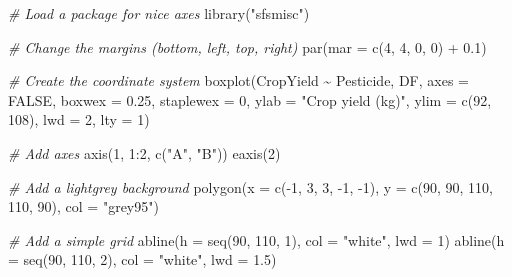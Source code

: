 \documentclass[
]{book}
\newenvironment{Shaded}{\begin{snugshade}}{\end{snugshade}}
\newcommand{\AttributeTok}[1]{\textcolor[rgb]{0.77,0.63,0.00}{#1}}
\newcommand{\CommentTok}[1]{\textcolor[rgb]{0.56,0.35,0.01}{\textit{#1}}}
\newcommand{\ConstantTok}[1]{\textcolor[rgb]{0.00,0.00,0.00}{#1}}
\newcommand{\DecValTok}[1]{\textcolor[rgb]{0.00,0.00,0.81}{#1}}
\newcommand{\FloatTok}[1]{\textcolor[rgb]{0.00,0.00,0.81}{#1}}
\newcommand{\FunctionTok}[1]{\textcolor[rgb]{0.00,0.00,0.00}{#1}}
\newcommand{\NormalTok}[1]{#1}
\newcommand{\SpecialCharTok}[1]{\textcolor[rgb]{0.00,0.00,0.00}{#1}}
\newcommand{\StringTok}[1]{\textcolor[rgb]{0.31,0.60,0.02}{#1}}
\begin{document}
\begin{Shaded}
\begin{Highlighting}[]
\CommentTok{\# Load a package for nice axes}
\FunctionTok{library}\NormalTok{(}\StringTok{"sfsmisc"}\NormalTok{)}

\CommentTok{\# Change the margins (bottom, left, top, right)}
\FunctionTok{par}\NormalTok{(}\AttributeTok{mar =} \FunctionTok{c}\NormalTok{(}\DecValTok{4}\NormalTok{, }\DecValTok{4}\NormalTok{, }\DecValTok{0}\NormalTok{, }\DecValTok{0}\NormalTok{) }\SpecialCharTok{+} \FloatTok{0.1}\NormalTok{)}

\CommentTok{\# Create the coordinate system}
\FunctionTok{boxplot}\NormalTok{(CropYield }\SpecialCharTok{\textasciitilde{}}\NormalTok{ Pesticide, DF, }\AttributeTok{axes =} \ConstantTok{FALSE}\NormalTok{, }\AttributeTok{boxwex =} \FloatTok{0.25}\NormalTok{, }\AttributeTok{staplewex =} \DecValTok{0}\NormalTok{,}
        \AttributeTok{ylab =} \StringTok{"Crop yield (kg)"}\NormalTok{, }\AttributeTok{ylim =} \FunctionTok{c}\NormalTok{(}\DecValTok{92}\NormalTok{, }\DecValTok{108}\NormalTok{), }\AttributeTok{lwd =} \DecValTok{2}\NormalTok{, }\AttributeTok{lty =} \DecValTok{1}\NormalTok{)}

\CommentTok{\# Add axes}
\FunctionTok{axis}\NormalTok{(}\DecValTok{1}\NormalTok{, }\DecValTok{1}\SpecialCharTok{:}\DecValTok{2}\NormalTok{, }\FunctionTok{c}\NormalTok{(}\StringTok{"A"}\NormalTok{, }\StringTok{"B"}\NormalTok{))}
\FunctionTok{eaxis}\NormalTok{(}\DecValTok{2}\NormalTok{)}

\CommentTok{\# Add a lightgrey background}
\FunctionTok{polygon}\NormalTok{(}\AttributeTok{x =} \FunctionTok{c}\NormalTok{(}\SpecialCharTok{{-}}\DecValTok{1}\NormalTok{, }\DecValTok{3}\NormalTok{, }\DecValTok{3}\NormalTok{, }\SpecialCharTok{{-}}\DecValTok{1}\NormalTok{, }\SpecialCharTok{{-}}\DecValTok{1}\NormalTok{), }\AttributeTok{y =} \FunctionTok{c}\NormalTok{(}\DecValTok{90}\NormalTok{, }\DecValTok{90}\NormalTok{, }\DecValTok{110}\NormalTok{, }\DecValTok{110}\NormalTok{, }\DecValTok{90}\NormalTok{), }\AttributeTok{col =} \StringTok{"grey95"}\NormalTok{)}

\CommentTok{\# Add a simple grid}
\FunctionTok{abline}\NormalTok{(}\AttributeTok{h =} \FunctionTok{seq}\NormalTok{(}\DecValTok{90}\NormalTok{, }\DecValTok{110}\NormalTok{, }\DecValTok{1}\NormalTok{), }\AttributeTok{col =} \StringTok{"white"}\NormalTok{, }\AttributeTok{lwd =} \DecValTok{1}\NormalTok{)}
\FunctionTok{abline}\NormalTok{(}\AttributeTok{h =} \FunctionTok{seq}\NormalTok{(}\DecValTok{90}\NormalTok{, }\DecValTok{110}\NormalTok{, }\DecValTok{2}\NormalTok{), }\AttributeTok{col =} \StringTok{"white"}\NormalTok{, }\AttributeTok{lwd =} \FloatTok{1.5}\NormalTok{)}


\end{Highlighting}
\end{Shaded}
\end{document}

